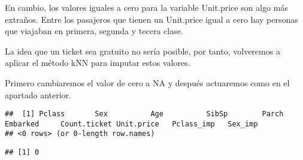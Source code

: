 \documentclass[
]{article}
\newenvironment{Shaded}{\begin{snugshade}}{\end{snugshade}}
\newcommand{\CommentTok}[1]{\textcolor[rgb]{0.50,0.62,0.50}{#1}}
\newcommand{\DataTypeTok}[1]{\textcolor[rgb]{0.87,0.87,0.75}{#1}}
\newcommand{\DecValTok}[1]{\textcolor[rgb]{0.86,0.86,0.80}{#1}}
\newcommand{\KeywordTok}[1]{\textcolor[rgb]{0.94,0.87,0.69}{#1}}
\newcommand{\NormalTok}[1]{\textcolor[rgb]{0.80,0.80,0.80}{#1}}
\newcommand{\OperatorTok}[1]{\textcolor[rgb]{0.94,0.94,0.82}{#1}}
\newcommand{\OtherTok}[1]{\textcolor[rgb]{0.94,0.94,0.56}{#1}}
\newcommand{\StringTok}[1]{\textcolor[rgb]{0.80,0.58,0.58}{#1}}
\begin{document}
En cambio, los valores iguales a cero para la variable Unit.price son
algo más extraños. Entre los pasajeros que tienen un Unit.price igual a
cero hay personas que viajaban en primera, segunda y tecera clase.

La idea que un ticket sea gratuito no sería posible, por tanto,
volveremos a aplicar el método kNN para imputar estos valores.

Primero cambiaremos el valor de cero a NA y después actuaremos como en
el apartado anterior.

\begin{Shaded}
\end{Shaded}

\begin{verbatim}
##  [1] Pclass       Sex          Age          SibSp        Parch        Embarked     Count.ticket Unit.price   Pclass_imp   Sex_imp     
## <0 rows> (or 0-length row.names)
\end{verbatim}

\begin{Shaded}
\end{Shaded}

\begin{verbatim}
## [1] 0
\end{verbatim}
\end{document}
